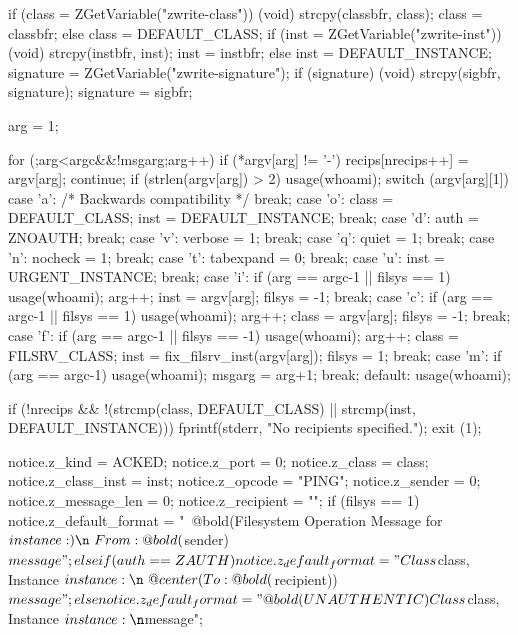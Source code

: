 \begin{code}
{    if (class = ZGetVariable("zwrite-class")) {
        (void) strcpy(classbfr, class);
        class = classbfr;
    }
    else
        class = DEFAULT_CLASS;
    if (inst = ZGetVariable("zwrite-inst")) {
        (void) strcpy(instbfr, inst);
        inst = instbfr;
    }
    else
        inst = DEFAULT_INSTANCE;
    signature = ZGetVariable("zwrite-signature");
    if (signature) {
        (void) strcpy(sigbfr, signature);
        signature = sigbfr;
    } 
        
    arg = 1;
        
    for (;arg<argc&&!msgarg;arg++) {
        if (*argv[arg] != '-') {
            recips[nrecips++] = argv[arg];
            continue;
        } 
        if (strlen(argv[arg]) > 2)
            usage(whoami);
        switch (argv[arg][1]) {
        case 'a':               /* Backwards compatibility */
            break;
        case 'o':
            class = DEFAULT_CLASS;
            inst = DEFAULT_INSTANCE;
            break;
        case 'd':
            auth = ZNOAUTH;
            break;
        case 'v':
            verbose = 1;
            break;
        case 'q':
            quiet = 1;
            break;
        case 'n':
            nocheck = 1;
            break;
        case 't':
            tabexpand = 0;
            break;
        case 'u':
            inst = URGENT_INSTANCE;
            break;
        case 'i':
            if (arg == argc-1 || filsys == 1)
                usage(whoami);
            arg++;
            inst = argv[arg];
            filsys = -1;
            break;
        case 'c':
            if (arg == argc-1 || filsys == 1)
                usage(whoami);
            arg++;
            class = argv[arg];
            filsys = -1;
            break;
        case 'f':
            if (arg == argc-1 || filsys == -1)
                usage(whoami);
            arg++;
            class = FILSRV_CLASS;
            inst = fix_filsrv_inst(argv[arg]);
            filsys = 1;
            break;
        case 'm':
            if (arg == argc-1)
                usage(whoami);
            msgarg = arg+1;
            break;
        default:
            usage(whoami);
        }
    }

    if (!nrecips && !(strcmp(class, DEFAULT_CLASS) ||
                      strcmp(inst, DEFAULT_INSTANCE))) {
        fprintf(stderr, "No recipients specified.\n");
        exit (1);
    }

    notice.z_kind = ACKED;
    notice.z_port = 0;
    notice.z_class = class;
    notice.z_class_inst = inst;
    notice.z_opcode = "PING";
    notice.z_sender = 0;
    notice.z_message_len = 0;
    notice.z_recipient = "";
    if (filsys == 1)
            notice.z_default_format = "\
@bold(Filesystem Operation Message for $instance:)\n\
From: @bold($sender)\n$message";
    else if (auth == ZAUTH)
        notice.z_default_format = "Class $class, Instance $instance:\n\
@center(To: @bold($recipient))\n$message";
    else
        notice.z_default_format =
            "@bold(UNAUTHENTIC) Class $class, Instance $instance:\n$message";

}
\end{code}
